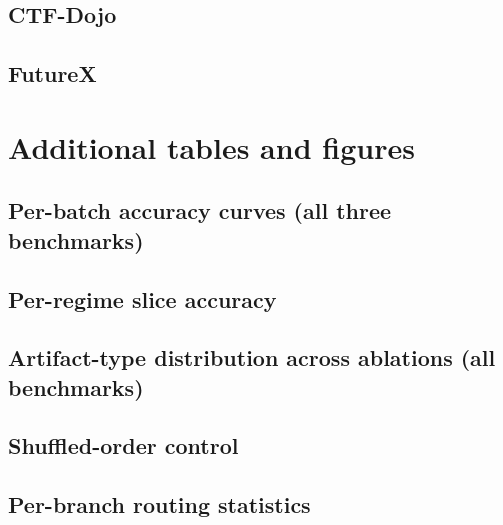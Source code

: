 \subsection{CTF-Dojo}

\subsection{FutureX}

\section{Additional tables and figures}
\label{app:extra}

\subsection{Per-batch accuracy curves (all three benchmarks)}

\subsection{Per-regime slice accuracy}

\subsection{Artifact-type distribution across ablations (all benchmarks)}
\label{app:compute_sanity}

\subsection{Shuffled-order control}
\label{app:shuffled}

\subsection{Per-branch routing statistics}


